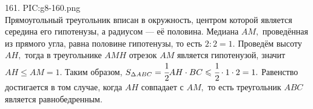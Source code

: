 161. {{PIC:g8-160.png}}\\
Прямоугольный треугольник вписан в окружность, центром которой является середина его гипотенузы, а радиусом --- её половина. Медиана $AM,$ проведённая из прямого угла, равна половине гипотенузы, то есть $2:2=1.$ Проведём высоту $AH,$ тогда в треугольнике $AMH$ отрезок $AM$ является гипотенузой, значит $AH\leqslant AM=1.$ Таким образом, $S_{\Delta ABC}=\cfrac{1}{2}AH\cdot BC \leqslant \cfrac{1}{2}\cdot 1 \cdot 2=1.$ Равенство достигается в том случае, когда $AH$ совпадает с $AM,$ то есть треугольник $ABC$ является равнобедренным.\newpage\noindent

